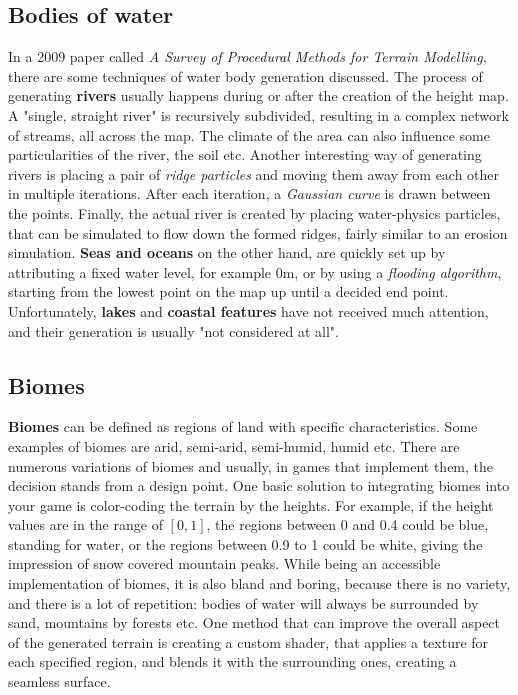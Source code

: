 \subsection{Bodies of water}

In a 2009 paper called \textit{A Survey of Procedural Methods for Terrain Modelling}\cite{smelik2009survey}, there are some techniques of water body generation discussed. The process of generating \textbf{rivers} usually happens during or after the creation of the height map. A "single, straight river" is recursively subdivided, resulting in a complex network of streams, all across the map. The climate of the area can also influence some particularities of the river, the soil etc. Another interesting way of generating rivers is placing a pair of \textit{ridge particles} and moving them away from each other in multiple iterations. After each iteration, a \textit{Gaussian curve} is drawn between the points. Finally, the actual river is created by placing water-physics particles, that can be simulated to flow down the formed ridges, fairly similar to an erosion simulation. \textbf{Seas and oceans} on the other hand, are quickly set up by attributing a fixed water level, for example 0m, or by using a \textit{flooding algorithm}, starting from the lowest point on the map up until a decided end point. Unfortunately, \textbf{lakes} and \textbf{coastal features} have not received much attention, and their generation is usually "not considered at all".

\subsection{Biomes}

\textbf{Biomes} can be defined as regions of land with specific characteristics. Some examples of biomes are arid, semi-arid, semi-humid, humid etc. There are numerous variations of biomes and usually, in games that implement them, the decision stands from a design point. One basic solution to integrating biomes into your game is color-coding the terrain by the heights. For example, if the height values are in the range of \([0, 1]\), the regions between 0 and 0.4 could be blue, standing for water, or the regions between 0.9 to 1 could be white, giving the impression of snow covered mountain peaks. While being an accessible implementation of biomes, it is also bland and boring, because there is no variety, and there is a lot of repetition: bodies of water will always be surrounded by sand, mountains by forests etc. One method that can improve the overall aspect of the generated terrain is creating a custom shader, that applies a texture for each specified region, and blends it with the surrounding ones, creating a seamless surface.\\

